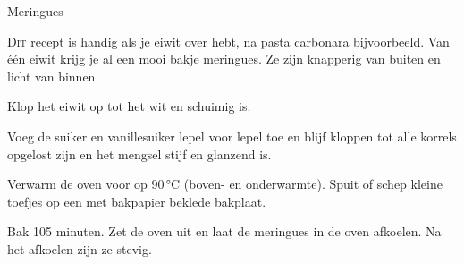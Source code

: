 \begin{recipe}{Meringues}
\label{recipe:meringues}


\lettrine{D}{it} recept is handig als je eiwit over hebt, na pasta carbonara
bijvoorbeeld. Van één eiwit krijg je al een mooi bakje meringues. Ze zijn
knapperig van buiten en licht van binnen.

\begin{ingredients}
\end{ingredients}

\begin{steps}
  \item Klop het eiwit op tot het wit en schuimig is.
  \item Voeg de suiker en vanillesuiker lepel voor lepel toe en blijf kloppen tot
        alle korrels opgelost zijn en het mengsel stijf en glanzend is.
  \item Verwarm de oven voor op 90\,°C (boven- en onderwarmte). Spuit of schep kleine toefjes op een met
        bakpapier beklede bakplaat.
  \item Bak 105 minuten. Zet de oven uit en laat de meringues in de oven afkoelen.
        Na het afkoelen zijn ze stevig.
\end{steps}

\end{recipe}
